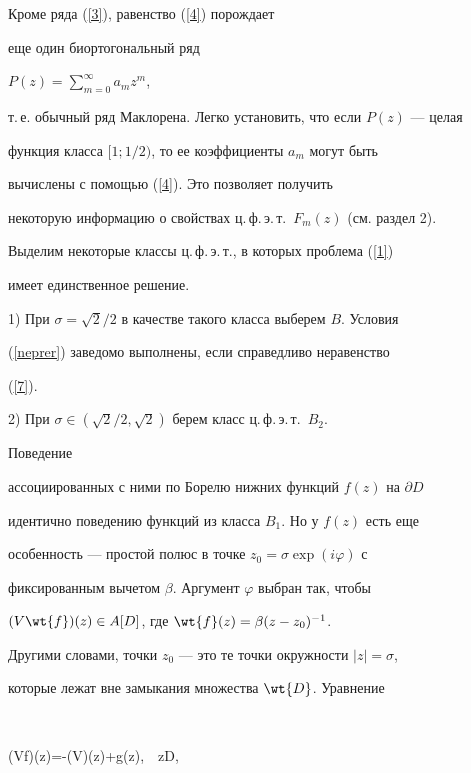 \begin{note}


Кроме ряда (\ref{3}), равенство (\ref{4}) порождает


еще один биортогональный ряд


$P(z)=\sum\limits_{m=0}^\infty a_mz^m$,


т.\,е. обычный ряд Маклорена. Легко установить, что если $P(z)$ --- целая


функция класса $[1;1/2)$, то ее коэффициенты $a_m$ могут быть


вычислены с помощью (\ref{4}). Это позволяет получить


некоторую информацию о свойствах ц.\,ф.\,э.\,т.\ $F_m(z)$ (см. раздел 2).


\end{note}





Выделим некоторые классы ц.\,ф.\,э.\,т., в которых проблема (\ref{1}) 


имеет единственное решение.





1) При $\sigma =\sqrt2/2$ в качестве такого класса выберем $B$. Условия


(\ref{neprer}) заведомо выполнены, если справедливо неравенство


(\ref{7}).





2) При $\sigma\in(\sqrt2/2,\sqrt{2})$ берем класс ц.\,ф.\,э.\,т.\ $B_2$.


Поведение


ассоциированных с ними по Борелю нижних функций $f(z)$ на $\partial D$


идентично поведению функций из класса $B_1$. Но у $f(z)$ есть еще


особенность --- простой полюс в точке $z_0=\sigma\exp(i\varphi)$ с


фиксированным вычетом $\beta$. Аргумент $\varphi$ выбран так, чтобы


$(V\wt{f})(z)\in A[D]$, где $\wt{f}(z)=\beta(z-z_0)^{-1}$.


Другими словами, точки $z_0$ --- это те точки окружности $|z|=\sigma$,


которые лежат вне замыкания множества $\wt{D}$. Уравнение


$$


(Vf)(z)=-(V)(z)+g(z),\ \ z\in D,


